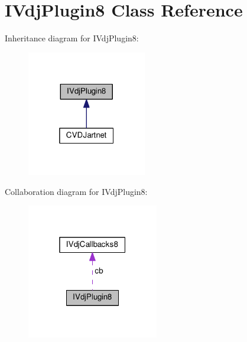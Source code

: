 \hypertarget{classIVdjPlugin8}{}\section{I\+Vdj\+Plugin8 Class Reference}
\label{classIVdjPlugin8}


Inheritance diagram for I\+Vdj\+Plugin8\+:
\nopagebreak
\begin{figure}[H]
\begin{center}
\leavevmode
\includegraphics[width=148pt]{classIVdjPlugin8__inherit__graph}
\end{center}
\end{figure}


Collaboration diagram for I\+Vdj\+Plugin8\+:
\nopagebreak
\begin{figure}[H]
\begin{center}
\leavevmode
\includegraphics[width=163pt]{classIVdjPlugin8__coll__graph}
\end{center}
\end{figure}
